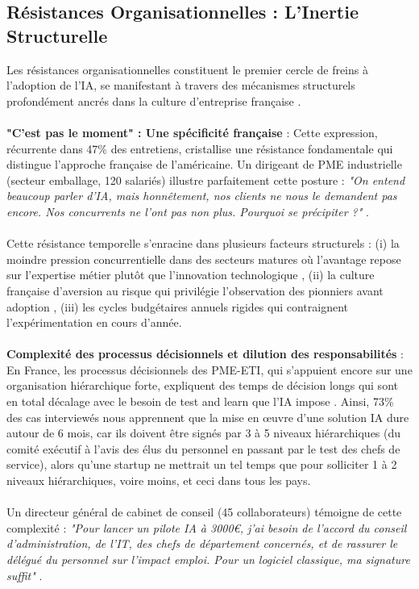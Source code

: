 \subsection{Résistances Organisationnelles : L'Inertie Structurelle}

Les résistances organisationnelles constituent le premier cercle de freins à l'adoption de l'IA, se manifestant à travers des mécanismes structurels profondément ancrés dans la culture d'entreprise française \cite{hofstede2001culture}.
\\\\
\textbf{"C'est pas le moment" : Une spécificité française} : Cette expression, récurrente dans 47\% des entretiens, cristallise une résistance fondamentale qui distingue l'approche française de l'américaine. Un dirigeant de PME industrielle (secteur emballage, 120 salariés) illustre parfaitement cette posture : \emph{"On entend beaucoup parler d'IA, mais honnêtement, nos clients ne nous le demandent pas encore. Nos concurrents ne l'ont pas non plus. Pourquoi se précipiter ?"} \cite{luwai2025meetings}. 
\\\\
Cette résistance temporelle s'enracine dans plusieurs facteurs structurels : (i) la moindre pression concurrentielle dans des secteurs matures où l'avantage repose sur l'expertise métier plutôt que l'innovation technologique \cite{porter1985competitive}, (ii) la culture française d'aversion au risque qui privilégie l'observation des pionniers avant adoption \cite{meyer2014culture}, (iii) les cycles budgétaires annuels rigides qui contraignent l'expérimentation en cours d'année.
\\\\
\textbf{Complexité des processus décisionnels et dilution des responsabilités} : En France, les processus décisionnels des PME-ETI, qui s’appuient encore sur une organisation hiérarchique forte, expliquent des temps de décision longs qui sont en total décalage avec le besoin de test and learn que l’IA impose \cite{bureaucratie2024french}. Ainsi, 73\% des cas interviewés nous apprennent que la mise en œuvre d’une solution IA dure autour de 6 mois, car ils doivent être signés par 3 à 5 niveaux hiérarchiques (du comité exécutif à l’avis des élus du personnel en passant par le test des chefs de service), alors qu’une startup ne mettrait un tel temps que pour solliciter 1 à 2 niveaux hiérarchiques, voire moins, et ceci dans tous les pays.
\\\\
Un directeur général de cabinet de conseil (45 collaborateurs) témoigne de cette complexité : \emph{"Pour lancer un pilote IA à 3000€, j'ai besoin de l'accord du conseil d'administration, de l'IT, des chefs de département concernés, et de rassurer le délégué du personnel sur l'impact emploi. Pour un logiciel classique, ma signature suffit"} \cite{luwai2025meetings}.
